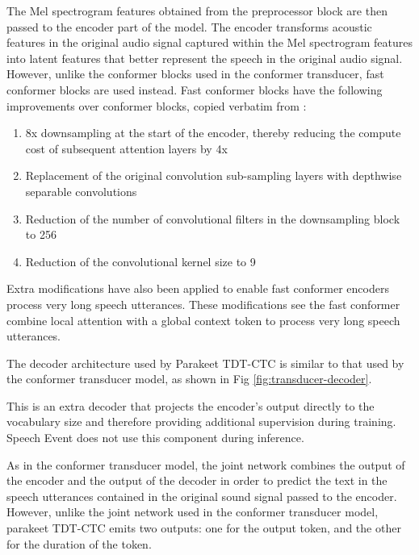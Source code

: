 \documentclass{CSSRforAfrica}
\newcounter{subsubsubsection}[subsubsection]
\begin{document}
The Mel spectrogram features obtained from the preprocessor block are then passed to the encoder part of the model. The encoder transforms acoustic features in the original audio signal captured within the Mel spectrogram features into latent features that better represent the speech in the original audio signal. However, unlike the conformer blocks used in the conformer transducer, fast conformer blocks are used instead. Fast conformer blocks have the following improvements over conformer blocks, copied verbatim from \cite{rekesh2023fastconformerlinearlyscalable}:

\begin{enumerate}
    \item 8x downsampling at the start of the encoder, thereby reducing the compute cost of subsequent attention layers by 4x
    \item Replacement of the original convolution sub-sampling layers with depthwise separable convolutions
    \item Reduction of the number of convolutional filters in the downsampling block to 256
    \item Reduction of the convolutional kernel size to 9
\end{enumerate}

Extra modifications have also been applied to enable fast conformer encoders process very long speech utterances. These modifications see the fast conformer combine local attention with a global context token to process very long speech utterances.

The decoder architecture used by Parakeet TDT-CTC is similar to that used by the conformer transducer model, as shown in Fig \ref{fig:transducer-decoder}.

This is an extra decoder that projects the encoder's output directly to the vocabulary size and therefore providing additional supervision during training. Speech Event does not use this component during inference.

As in the conformer transducer model, the joint network combines the output of the encoder and the output of the decoder in order to predict the text in the speech utterances contained in the original sound signal passed to the encoder. However, unlike the joint network used in the conformer transducer model, parakeet TDT-CTC emits two outputs: one for the output token, and the other for the duration of the token. \cite{xu2023efficientsequencetransductionjointly}
\end{document}
